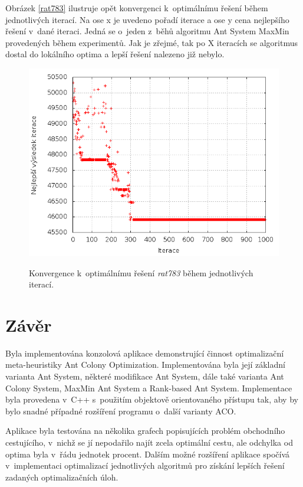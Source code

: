 \documentclass[a4paper, 12pt]{article}
\begin{document}
Obrázek \ref{rat783} ilustruje opět konvergenci k~optimálnímu řešení během jednotlivých iterací. Na ose x je uvedeno pořadí iterace a ose y cena nejlepšího
řešení v~dané iteraci. Jedná se o~jeden z~běhů algoritmu Ant System MaxMin provedených během experimentů. Jak je zřejmé, tak po X iteracích se algoritmus
dostal do lokálního optima a lepší řešení nalezeno již nebylo.
\begin{figure}[bt]
\begin{center}
\scalebox{0.6}
{
  \includegraphics{imgs/best_lin.png}
}
\caption{
Konvergence k~optimálnímu řešení \emph{rat783} během jednotlivých iterací.}
\label{fig:best_rat}
\end{center}
\end{figure}

\section{Závěr}
\label{sec:concl}
Byla implementována konzolová aplikace demonstrující činnost optimalizační meta-heuristiky Ant Colony Optimization. 
Implementována byla její základní varianta Ant System, některé
modifikace Ant System, dále také varianta Ant Colony System, MaxMin Ant System a Rank-based Ant System.
Implementace byla provedena v~C++ s~použitím objektově orientovaného přístupu tak, aby by bylo snadné případné rozšíření programu o~další varianty ACO.

Aplikace byla testována na několika grafech popisujících problém obchodního cestujícího, v~nichž se jí nepodařilo najít zcela optimální cestu, ale odchylka 
od optima byla v~řádu jednotek procent. Dalším možné rozšíření aplikace spočívá v~implementaci optimalizací jednotlivých algoritmů
pro získání lepších řešení zadaných optimalizačních úloh.
\end{document}
